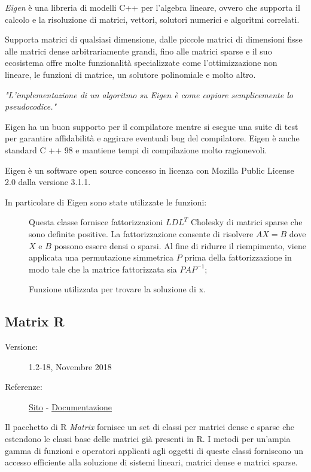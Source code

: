 \textit{Eigen} è una libreria di modelli C++ per l'algebra lineare, ovvero che supporta il calcolo e la risoluzione di matrici, vettori, solutori numerici e algoritmi correlati.

Supporta matrici di qualsiasi dimensione, dalle piccole matrici di dimensioni fisse alle matrici dense arbitrariamente grandi, fino alle matrici sparse e il suo ecosistema offre molte funzionalità specializzate come l'ottimizzazione non lineare, le funzioni di matrice, un solutore polinomiale e molto altro.

\textit{"L'implementazione di un algoritmo su Eigen è come copiare semplicemente lo pseudocodice."}

Eigen ha un buon supporto per il compilatore mentre si esegue una suite di test per garantire affidabilità e aggirare eventuali bug del compilatore. Eigen è anche standard C ++ 98 e mantiene tempi di compilazione molto ragionevoli.

Eigen è un software open source concesso in licenza con Mozilla Public License 2.0 dalla versione 3.1.1.

In particolare di Eigen sono state utilizzate le funzioni:
\begin{description}
\item[\verb!SimplicialLDLT< >] Questa classe fornisce fattorizzazioni $LDL^ T$ Cholesky di matrici sparse che sono definite positive. La fattorizzazione consente di risolvere $AX = B$ dove $X$ e $B$ possono essere densi o sparsi. Al fine di ridurre il riempimento, viene applicata una permutazione simmetrica $P$ prima della fattorizzazione in modo tale che la matrice fattorizzata sia $PAP ^ {-1}$;
\item[\verb!solve()] Funzione utilizzata per trovare la soluzione di x.
\end{description}


\subsection{Matrix R}
\begin{description}
\item[Versione:] 1.2-18, Novembre 2018
\item[Referenze:] \href{http://matrix.r-forge.r-project.org}{Sito} - \href{https://www.rdocumentation.org/packages/Matrix}{Documentazione}
\end{description}

Il pacchetto di R \textit{Matrix} fornisce un set di classi per matrici dense e sparse che estendono le classi base delle matrici già presenti in R. I metodi per un'ampia gamma di funzioni e operatori applicati agli oggetti di queste classi forniscono un accesso efficiente alla soluzione di sistemi lineari, matrici dense e matrici sparse.

